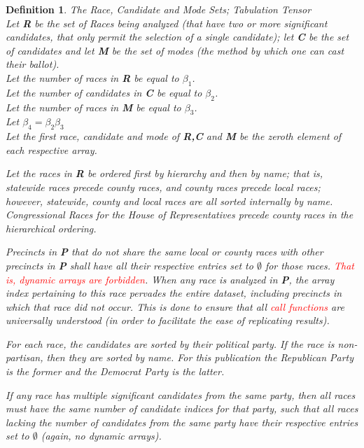 \documentclass[preprint,13pt]{elsarticle}
\newtheorem{definition}{Definition}[section]
\begin{document}
\begin{definition}{The Race, Candidate and Mode Sets; Tabulation Tensor}\\
Let \textbf{R} be the set of Races being analyzed (that have two or more significant candidates, that only permit the selection of a single candidate); let \textbf{C} be the set of candidates and let \textbf{M} be the set of modes (the method by which one can cast their ballot).\\
Let the number of races in \textbf{R} be equal to $\beta_{1}$.\\
Let the number of candidates in \textbf{C} be equal to $\beta_{2}$.\\
Let the number of races in \textbf{M} be equal to $\beta_{3}$.\\
Let $\beta_{4}=\beta_{2}\beta_{3}$\\
Let the first race, candidate and mode of \textbf{R,C} and \textbf{M} be the zeroth element of each respective array.

Let the races in \textbf{R} be ordered first by hierarchy and then by name; that is, statewide races precede county races, and county races precede local races; however, statewide, county and local races are all sorted internally by name. Congressional Races for the House of Representatives precede county races in the hierarchical ordering.

Precincts in \textbf{P} that do not share the same local or county races with other precincts in \textbf{P} shall have all their respective entries set to $\emptyset$ for those races. \textcolor{red}{That is, dynamic arrays are forbidden}. When any race is analyzed in \textbf{P}, the array index pertaining to this race pervades the entire dataset, including precincts in which that race did not occur. This is done to ensure that all \textcolor{red}{call functions} are universally understood (in order to facilitate the ease of replicating results).

For each race, the candidates are sorted by their political party. If the race is non-partisan, then they are sorted by name. For this publication the Republican Party is the former and the Democrat Party is the latter.

If any race has multiple significant candidates from the same party, then all races must have the same number of candidate indices for that party, such that all races lacking the number of candidates from the same party have their respective entries set to $\emptyset$ (again, no dynamic arrays).


\end{definition}
\end{document}

